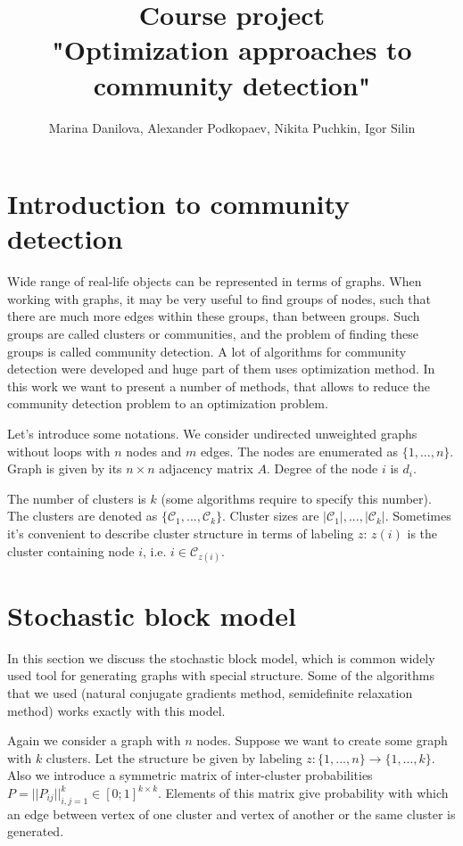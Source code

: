 \documentclass[11pt,a4paper]{extarticle}
\title{Course project \\
"Optimization approaches to community detection"}
\author{ Marina Danilova, Alexander Podkopaev, Nikita Puchkin, Igor Silin }
\begin{document}
\maketitle

\section{Introduction to community detection}
Wide range of real-life objects can be represented in terms of graphs. When working with graphs, it may be very useful to find groups of nodes, such that there are much more edges within these groups, than between groups. Such groups are called clusters or communities, and the problem of finding these groups is called community detection. A lot of algorithms for community detection were developed and huge part of them uses optimization method. In this work we want to present a number of methods, that allows to reduce the community detection problem to an optimization problem.

Let's introduce some notations.
We consider undirected unweighted graphs without loops with $n$ nodes and $m$ edges.
The nodes are enumerated as $\{ 1, ..., n\}$. 
Graph is given by its $n \times n $ adjacency matrix $A$.
Degree of the node $i$ is $d_i$. 

The number of clusters is $k$ (some algorithms require to specify this number).
The clusters are denoted as $\{ \mathcal{C}_1, ..., \mathcal{C}_k\}$.
Cluster sizes are $ |\mathcal{C}_1|, ..., |\mathcal{C}_k|$.
Sometimes it's convenient to describe cluster structure in terms of labeling $z$: $z(i)$ is the cluster containing node $i$, i.e. $i \in \mathcal{C}_{z(i)}$.
				
\section{Stochastic block model}
	In this section we discuss the stochastic block model, which is common widely used tool for generating graphs with special structure.
	Some of the algorithms that we used (natural conjugate gradients method, semidefinite relaxation method) works exactly with this model.
		
		Again we consider a graph with $n$ nodes.
		Suppose we want to create some graph with $k$ clusters. 
		Let the structure be given by labeling $z: \{ 1,...,n\} \rightarrow \{ 1,...,k\}$.
		Also we introduce a symmetric matrix of inter-cluster probabilities $P = ||P_{ij}||_{i,j = 1}^k \in [0; 1]^{k\times k}$. Elements of this matrix give probability with which an edge between vertex of one cluster and vertex of another or the same cluster is generated.
		
\end{document}
